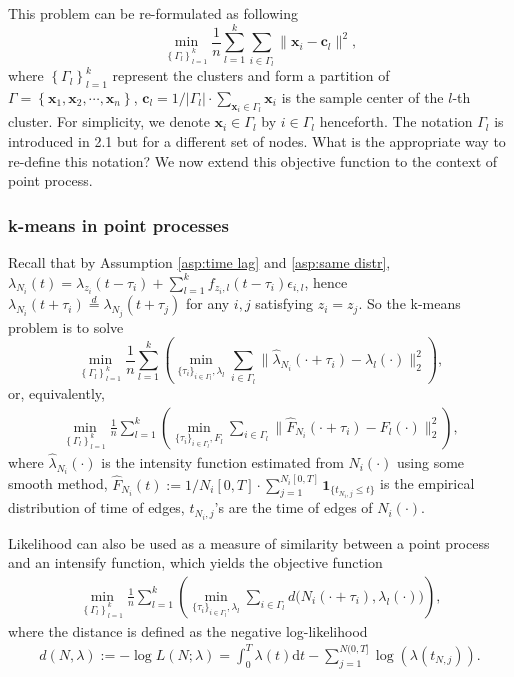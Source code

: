 			
			This problem can be re-formulated as following 
			\begin{equation}\label{eq:kmeans}
			\min_{\left\{ \Gamma_l \right\}_{l=1}^k}\frac{1}{n}\sum_{l=1}^k\sum_{i\in {\Gamma}_l} \|\mathbf{x}_i- \mathbf{c}_l\|^2,
			\end{equation}
			where $\left\{ \Gamma_l \right\}_{l=1}^k$ represent the clusters and form a partition of $\Gamma = \left\{ \mathbf{x}_1,\mathbf{x}_2,\cdots,\mathbf{x}_n \right\}$,
			$\mathbf{c}_l = {1}/{|\Gamma_l|}\cdot\sum_{\mathbf{x}_i\in \Gamma_l}\mathbf{x}_i$ is the sample center of the $l$-th cluster. 
			For simplicity, we denote $\mathbf{x}_i\in \Gamma_l$ by $i\in\Gamma_l$ henceforth.
			{\color{red} The notation $\Gamma_l$ is introduced in 2.1 but for a different set of nodes. What is the appropriate way to re-define this notation?}
			We now extend this objective function to the context of point process.
		
		\subsubsection*{k-means in point processes}
			Recall that by Assumption \ref{asp:time lag} and \ref{asp:same distr}, $\lambda_{N_i}(t)=\lambda_{z_i}(t-\tau_i)+\sum_{l=1}^kf_{z_i,l}(t-\tau_i)\epsilon_{i,l}$, 
			hence $\lambda_{N_i}(t+\tau_i)\overset{d}{=}\lambda_{N_j}(t+\tau_j)$ for any $i,j$ satisfying $z_i=z_j$.
			So the k-means problem is to solve
			\begin{equation}\label{eq:kmeans_lambda}
			\min_{\left\{ \Gamma_l \right\}_{l=1}^k} \frac{1}{n} \sum_{l=1}^k \left(\min_{\{\tau_i\}_{i\in\Gamma_l},\lambda_l} \sum_{i\in\Gamma_l} \|\hat\lambda_{N_i}(\cdot+\tau_i)- \lambda_l(\cdot)\|_2^2 \right),
			\end{equation}
			or, equivalently,
			\begin{align}\label{eq:kmeans_F}
			\min_{\left\{ \Gamma_l \right\}_{l=1}^k} \frac{1}{n} \sum_{l=1}^k \left(\min_{\{\tau_i\}_{i\in\Gamma_l},F_l} \sum_{i\in\Gamma_l} \|\hat F_{N_i}(\cdot+\tau_i)- F_l(\cdot)\|_2^2 \right),
			\end{align}
			where $\hat \lambda_{N_i}(\cdot)$ is the intensity function estimated from $N_i(\cdot)$ using some smooth method,
			$\hat F_{N_i}(t):=1/{N_i[0,T]}\cdot\sum_{j=1}^{N_i[0,T]}\mathbf{1}_{\{t_{N_i,j}\leq t\}}$ is the empirical distribution of time of edges, $t_{N_i,j}$'s are the time of edges of $N_i(\cdot)$.

			Likelihood can also be used as a measure of similarity between a point process and an intensify function,
			which yields the objective function
			\begin{align}\label{eq:kmeans_likelihood}
			\min_{\left\{ \Gamma_l \right\}_{l=1}^k} \frac{1}{n} \sum_{l=1}^k \left(\min_{\{\tau_i\}_{i\in\Gamma_l},\lambda_l} \sum_{i\in\Gamma_l} d\big({N_i}(\cdot+\tau_i), \lambda_l(\cdot)\big) \right),
			\end{align}
			where the distance is defined as the negative log-likelihood
			\begin{align*}
			d(N, \lambda) := -\log L(N;\lambda) = \int_{0}^T\lambda(t)\text{d}t - \sum_{j=1}^{N(0,T]}\log \left( \lambda(t_{N,j}) \right) .
			\end{align*}
				
